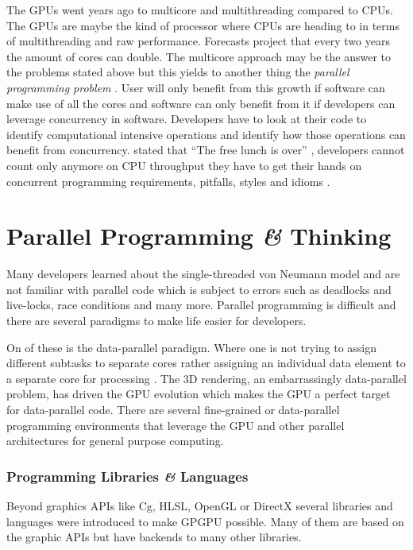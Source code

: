 The \glspl{GPU} went years ago to multicore and multithreading compared to
\glspl{CPU}. The \glspl{GPU} are maybe the kind of processor where \glspl{CPU}
are heading to in terms of multithreading and raw performance. Forecasts project
that every two years the amount of cores can double. The multicore approach may
be the answer to the problems stated above but this yields to another thing the
\emph{parallel programming problem} \citep{citeulike:3750573}. User will only
benefit from this growth if software can make use of all the cores and software
can only benefit from it if developers can leverage concurrency in software.
Developers have to look at their code to identify computational intensive
operations and identify how those operations can benefit from concurrency.
\citep{citeulike:6643735} stated that ``The free
lunch is over'' , developers cannot count only anymore on \gls{CPU} throughput
they have to get their hands on concurrent programming requirements, pitfalls,
styles and idioms \citep{citeulike:6643735}.


\section{Parallel Programming \textit{\&} Thinking} %
\label{sec:parallel_programming__thinking}

Many developers learned about the single-threaded von Neumann model and are not
familiar with parallel code which is subject to errors such as deadlocks and
live-locks, race conditions and many more. Parallel programming is difficult and
there are several paradigms to make life easier for developers.

On of these is the data-parallel paradigm. Where one is not trying to assign
different subtasks to separate cores rather assigning an individual data
element to a separate core for processing \citep{citeulike:3750565}. The
\gls{3D} rendering, an embarrassingly data-parallel problem, has driven the
\gls{GPU} evolution which makes the \gls{GPU} a perfect target for data-parallel
code. There are several fine-grained or data-parallel programming environments
that leverage the \gls{GPU} and other parallel architectures for general purpose
computing.

\subsubsection{Programming Libraries {\textit{\&}} Languages} %
\label{ssub:programming_libraries_and_languages}
Beyond graphics \glspl{API} like Cg, \gls{HLSL}, OpenGL or DirectX several 
libraries and languages were introduced to make \gls{GPGPU} possible. Many of them
are based on the graphic \glspl{API} but have backends to many other libraries. 

